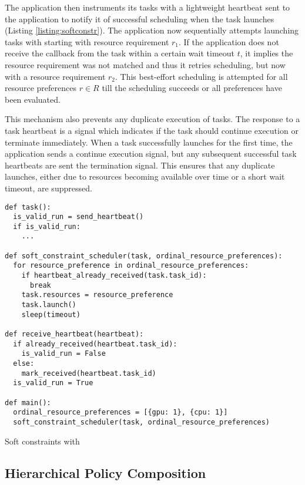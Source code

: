 The application then instruments its tasks with a lightweight heartbeat sent to the application to notify it of successful scheduling when the task launches (Listing \ref{listing:softconstr}). The application now sequentially attempts launching tasks with starting with resource requirement $r_1$. If the application does not receive the callback from the task within a certain wait timeout $t$, it implies the resource requirement was not matched and thus it retries scheduling, but now with a resource requirement $r_2$. This best-effort scheduling is attempted for all resource preferences $r \in R$ till the scheduling succeeds or all preferences have been evaluated.

This mechanism also prevents any duplicate execution of tasks. The response to a task heartbeat is a signal which indicates if the task should continue execution or terminate immediately. When a task successfully launches for the first time, the application sends a continue execution signal, but any subsequent successful task heartbeats are sent the termination signal. This ensures that any duplicate launches, either due to resources becoming available over time or a short wait timeout, are suppressed.


\begin{listing}
\begin{verbatim}
def task():
  is_valid_run = send_heartbeat()
  if is_valid_run:
    ...

def soft_constraint_scheduler(task, ordinal_resource_preferences):
  for resource_preference in ordinal_resource_preferences:
    if heartbeat_already_received(task.task_id):
      break
    task.resources = resource_preference
    task.launch()
    sleep(timeout)

def receive_heartbeat(heartbeat):
  if already_received(heartbeat.task_id):
    is_valid_run = False
  else:
    mark_received(heartbeat.task_id)
  is_valid_run = True

def main():
  ordinal_resource_preferences = [{gpu: 1}, {cpu: 1}]
  soft_constraint_scheduler(task, ordinal_resource_preferences)
\end{verbatim}
\caption{Soft constraints with \name{}}
\label{listing:softconstr}
\end{listing}

\subsection{Hierarchical Policy Composition}
\label{policies:composition}

